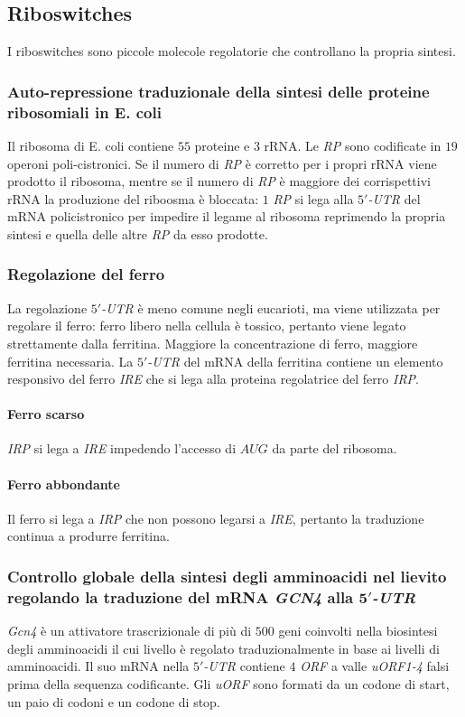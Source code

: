 \subsection{Riboswitches}
I riboswitches sono piccole molecole regolatorie che controllano la propria sintesi. 
\subsubsection{Auto-repressione traduzionale della sintesi delle proteine ribosomiali in E. coli}
Il ribosoma di E. coli contiene $55$ proteine e $3$ rRNA. Le \emph{RP} sono codificate in $19$ operoni poli-cistronici. Se il numero di \emph{RP} \`e corretto per i propri rRNA viene prodotto il 
ribosoma, mentre se il numero di \emph{RP} \`e maggiore dei corrispettivi rRNA la produzione del riboosma \`e bloccata: $1$ \emph{RP} si lega alla \emph{$5'$-UTR} del mRNA policistronico per impedire 
il legame al ribosoma reprimendo la propria sintesi e quella delle altre \emph{RP} da esso prodotte. 
\subsubsection{Regolazione del ferro}
La regolazione \emph{$5'$-UTR} \`e meno comune negli eucarioti, ma viene utilizzata per regolare il ferro: ferro libero nella cellula \`e tossico, pertanto viene legato strettamente dalla ferritina. 
Maggiore la concentrazione di ferro, maggiore ferritina necessaria. La \emph{$5'$-UTR} del mRNA della ferritina contiene un elemento responsivo del ferro \emph{IRE} che si lega alla proteina regolatrice
del ferro \emph{IRP}. 
\paragraph{Ferro scarso}
\emph{IRP} si lega a \emph{IRE} impedendo l'accesso di $AUG$ da parte del ribosoma.
\paragraph{Ferro abbondante}
Il ferro si lega a \emph{IRP} che non possono legarsi a \emph{IRE}, pertanto la traduzione continua a produrre ferritina. 
\subsubsection{Controllo globale della sintesi degli amminoacidi nel lievito regolando la traduzione del mRNA \emph{GCN4} alla \emph{$\mathbf{5'}$-UTR}}
\emph{Gcn4} \`e un attivatore trascrizionale di pi\`u di $500$ geni coinvolti nella biosintesi degli amminoacidi il cui livello \`e regolato traduzionalmente in base ai livelli di amminoacidi. Il suo
mRNA nella \emph{$5'$-UTR} contiene $4$ \emph{ORF} a valle \emph{uORF1-4} falsi prima della sequenza codificante. Gli \emph{uORF} sono formati da un codone di start, un paio di codoni e un codone di 
stop.
